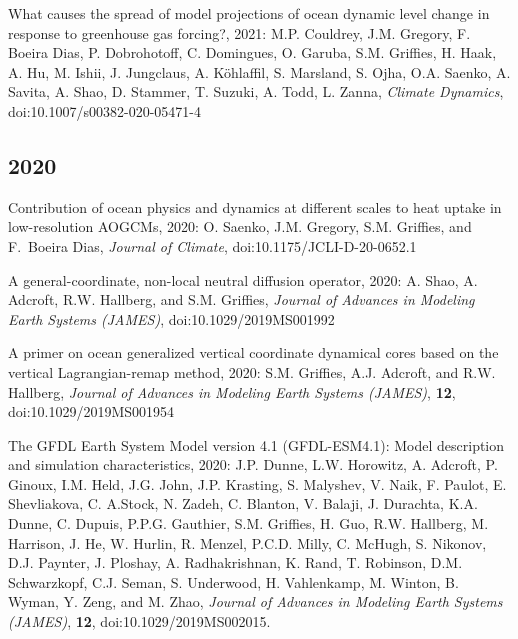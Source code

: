 \begin{etaremune}
\item What causes the spread of model projections of ocean dynamic level change in response to greenhouse gas forcing?, 2021:  M.P. Couldrey, J.M. Gregory,  F. Boeira Dias, P. Dobrohotoff, C. Domingues, O. Garuba, S.M. Griffies, H. Haak, A. Hu, M. Ishii, J. Jungclaus, A. {K\"{o}hlaffil}, S. Marsland, S. Ojha, O.A. Saenko, A. Savita, A. Shao, D. Stammer, T. Suzuki, A. Todd, L. Zanna, {\it Climate Dynamics}, doi:10.1007/s00382-020-05471-4


\subsection*{\sc \color{Maroon} 2020}

\item Contribution of ocean physics and dynamics at different scales to heat uptake in low-resolution AOGCMs, 2020: O. Saenko, J.M. Gregory, S.M. Grif\/f\/ies, and F.\ Boeira Dias, {\it Journal of Climate}, doi:10.1175/JCLI-D-20-0652.1

\item A general-coordinate, non-local neutral diffusion operator, 2020: A. Shao, A. Adcroft, R.W. Hallberg, and S.M. Grif\/f\/ies, {\it Journal of Advances in Modeling Earth Systems (JAMES)}, doi:10.1029/2019MS001992



\item A primer on ocean generalized vertical coordinate dynamical cores based on the vertical Lagrangian-remap method, 2020: S.M. Grif\/f\/ies, A.J. Adcroft, and R.W. Hallberg, {\it Journal of Advances in Modeling Earth Systems (JAMES)}, {\bf 12}, \\ doi:10.1029/2019MS001954

\item The GFDL Earth System Model version 4.1 (GFDL-ESM4.1): Model description and simulation characteristics, 2020: J.P. Dunne, L.W. Horowitz, A. Adcroft, P. Ginoux, I.M. Held, J.G. John, J.P. Krasting, S. Malyshev, V. Naik, F. Paulot, E. Shevliakova, C. A.Stock, N. Zadeh, C. Blanton, V. Balaji, J. Durachta, K.A. Dunne, C. Dupuis, P.P.G. Gauthier, S.M. Griffies, H. Guo, R.W. Hallberg, M. Harrison, J. He, W. Hurlin, R. Menzel, P.C.D. Milly, C. McHugh, S. Nikonov, D.J. Paynter, J. Ploshay, A. Radhakrishnan, K. Rand, T. Robinson, D.M. Schwarzkopf, C.J. Seman, S. Underwood, H. Vahlenkamp, M. Winton, B. Wyman, Y. Zeng, and M. Zhao, {\it Journal of Advances in Modeling Earth Systems (JAMES)}, {\bf 12}, doi:10.1029/2019MS002015.


\end{etaremune}

